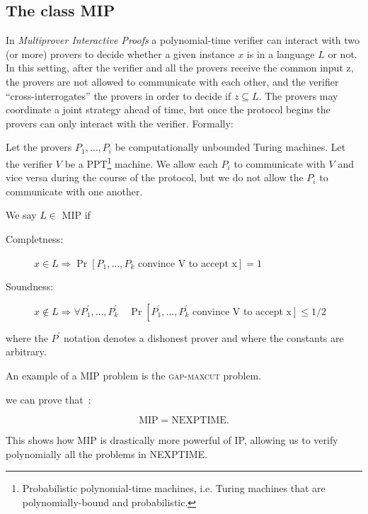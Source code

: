 \subsection{The class MIP}
In \emph{Multiprover Interactive Proofs} a polynomial-time verifier can interact with two (or more) provers to decide
whether a given instance $x$ is in a language $L$ or not. In this setting, after the verifier and all the provers receive the common input z, the provers are not allowed to communicate with each other, and the verifier “cross-interrogates” the provers in order to decide if $z \subseteq L$. The provers may coordinate a joint strategy ahead of time, but once the protocol begins the provers can only interact with the verifier. Formally:
\begin{defn}
    Let the provers $P_{1}, \ldots, P_{i}$ be computationally unbounded Turing machines. Let the verifier $V$ be a PPT\footnote{Probabilistic polynomial-time machines, i.e. Turing machines that are polynomially-bound and probabilistic.} machine. We allow each $P_{i}$ to communicate with $V$ and vice versa during the course of the protocol, but we do not allow the $P_{i}$ to communicate with one another. 
    
    We say $L \in$ MIP if 
    \begin{description}
\item[Completness: ]$x \in L \Rightarrow \operatorname{Pr}\left[P_{1}, \ldots, P_{k}\right.$ convince $\mathrm{V}$ to accept $\left.\mathrm{x}\right]=1$
\item[Soundness: ]$x \notin L \Rightarrow \forall P_{1}^{\prime}, \ldots, P_{k}^{\prime} \quad \operatorname{Pr}\left[P_{1}^{\prime}, \ldots, P_{k}^{\prime}\right.$ convince $\mathrm{V}$ to accept $\left.\mathrm{x}\right] \leq 1 / 2$
    \end{description}   
    where the $P^{\prime}$ notation denotes a dishonest prover and where the constants are arbitrary.
\end{defn}

An example of a MIP problem is the \textsc{gap-maxcut} problem.

we can prove that~\cite{topicsin}:
\begin{theorem}\label{th:mip-nexptime}
    \begin{equation}
\text{MIP}=\text{NEXPTIME}.
    \end{equation}
\end{theorem}

This shows how MIP is drastically more powerful of IP, allowing us to verify polynomially all the problems in NEXPTIME.


